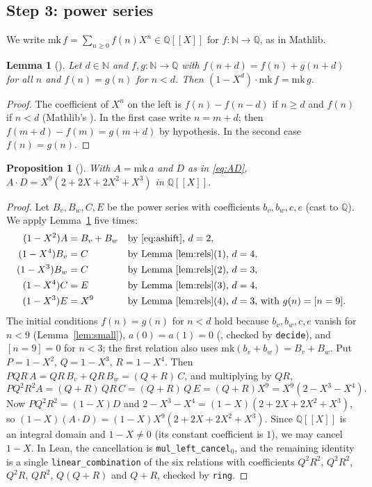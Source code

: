 \documentclass[11pt]{amsart}
\theoremstyle{plain}
\newtheorem{lemma}[theorem]{Lemma}
\newtheorem{proposition}[theorem]{Proposition}
\theoremstyle{definition}
\newcommand{\N}{\mathbb{N}}
\newcommand{\Q}{\mathbb{Q}}
\newcommand{\Qx}{\Q[\![X]\!]}
\begin{document}
\subsection*{Step 3: power series}
We write $\mathrm{mk}\,f=\sum_{n\ge0}f(n)X^n\in\Qx$ for $f:\N\to\Q$, as in Mathlib.

\begin{lemma}[]\label{lem:ps}
Let $d\in\N$ and $f,g:\N\to\Q$ with $f(n+d)=f(n)+g(n+d)$ for all $n$ and $f(n)=g(n)$ for $n<d$.
Then $(1-X^d)\cdot\mathrm{mk}\,f=\mathrm{mk}\,g$.
\end{lemma}

\begin{proof}
The coefficient of $X^n$ on the left is $f(n)-f(n-d)$ if $n\ge d$ and $f(n)$ if $n<d$ (Mathlib's ).
In the first case write $n=m+d$; then $f(m+d)-f(m)=g(m+d)$ by hypothesis. In the second case $f(n)=g(n)$.
\end{proof}

\begin{proposition}[]\label{prop:AD}
With $A=\mathrm{mk}\,a$ and $D$ as in \eqref{eq:AD}, $A\cdot D=X^9(2+2X+2X^2+X^3)$ in $\Qx$.
\end{proposition}

\begin{proof}
Let $B_v,B_w,C,E$ be the power series with coefficients $b_v,b_w,c,e$ (cast to $\Q$).
We apply Lemma~\ref{lem:ps} five times:
\begin{align*}
  (1-X^2)A&=B_v+B_w && \text{by \eqref{eq:ashift}, $d=2$},\\
  (1-X^4)B_v&=C && \text{by Lemma~\ref{lem:rels}(1), $d=4$},\\
  (1-X^3)B_w&=C && \text{by Lemma~\ref{lem:rels}(2), $d=3$},\\
  (1-X^4)C&=E && \text{by Lemma~\ref{lem:rels}(3), $d=4$},\\
  (1-X^3)E&=X^9 && \text{by Lemma~\ref{lem:rels}(4), $d=3$, with $g(n)=[n=9]$}.
\end{align*}
The initial conditions $f(n)=g(n)$ for $n<d$ hold because $b_v,b_w,c,e$ vanish for $n<9$ (Lemma~\ref{lem:small}), $a(0)=a(1)=0$ (, checked by \texttt{decide}), and $[n=9]=0$ for $n<3$; the first relation also uses $\mathrm{mk}(b_v+b_w)=B_v+B_w$.
Put $P=1-X^2$, $Q=1-X^3$, $R=1-X^4$. Then $PQR\,A=QR\,B_v+QR\,B_w=(Q+R)\,C$, and multiplying by $QR$,
\[
  PQ^2R^2A=(Q+R)\,QR\,C=(Q+R)\,Q\,E=(Q+R)X^9=X^9(2-X^3-X^4).
\]
Now $PQ^2R^2=(1-X)D$ and $2-X^3-X^4=(1-X)(2+2X+2X^2+X^3)$, so $(1-X)(A\cdot D)=(1-X)X^9(2+2X+2X^2+X^3)$.
Since $\Qx$ is an integral domain and $1-X\ne0$ (its constant coefficient is $1$), we may cancel $1-X$.
In Lean, the cancellation is \texttt{mul\_left\_cancel}$_0$, and the remaining identity is a single \texttt{linear\_combination} of the six relations with coefficients $Q^2R^2$, $Q^2R^2$, $Q^2R$, $QR^2$, $Q(Q+R)$ and $Q+R$, checked by \texttt{ring}.
\end{proof}
\end{document}
